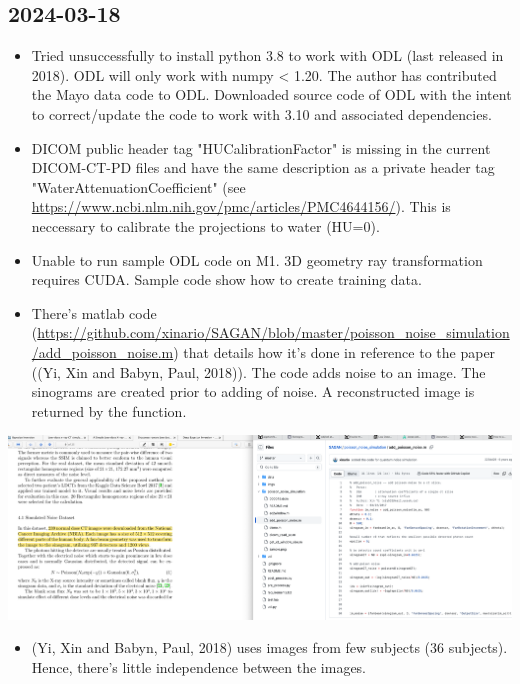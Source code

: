 \documentclass[a4paper, 11pt]{article}
\begin{document}
\subsection{2024-03-18}
\label{sec:org4ce5873}
\begin{itemize}
\item Tried unsuccessfully to install python 3.8 to work with ODL (last released in 2018). ODL will only work with numpy < 1.20. The author has contributed the Mayo data code to ODL. Downloaded source code of ODL with the intent to correct/update the code to work with 3.10 and associated dependencies.
\item DICOM public header tag "HUCalibrationFactor" is missing in the current DICOM-CT-PD files and have the same description as a private header tag "WaterAttenuationCoefficient" (see \url{https://www.ncbi.nlm.nih.gov/pmc/articles/PMC4644156/}). This is neccessary to calibrate the projections to water (HU=0).
\item Unable to run sample ODL code on M1. 3D geometry ray transformation requires CUDA. Sample code show how to create training data.
\item There's matlab code  (\url{https://github.com/xinario/SAGAN/blob/master/poisson\_noise\_simulation/add\_poisson\_noise.m}) that details how it's done in reference to the paper ((Yi, Xin and Babyn, Paul, 2018)). The code adds noise to an image. The sinograms are created prior to adding of noise. A reconstructed image is returned by the function.
\end{itemize}

\begin{center}
\includegraphics[width=.9\linewidth]{20240318-192545_screenshot.png}
\end{center}

\begin{itemize}
\item (Yi, Xin and Babyn, Paul, 2018) uses images from few subjects (36 subjects). Hence, there's little independence between the images.
\end{itemize}
\end{document}
